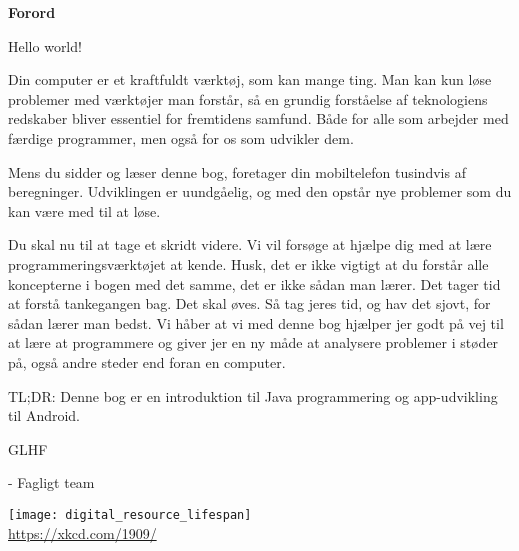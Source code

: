 \cleardoublepage
\begin{titlepage}
	\centering
	\vspace{3cm}
	{\Huge\sffamily\bfseries Forord \par} \vspace{0.5cm}
	
	Hello world!
	
	Din computer er et kraftfuldt værktøj, som kan mange ting. Man kan kun løse problemer med værktøjer man forstår, så en grundig forståelse af teknologiens redskaber bliver essentiel for fremtidens samfund. Både for alle som arbejder med færdige programmer, men også for os som udvikler dem. 
	
	Mens du sidder og læser denne bog, foretager din mobiltelefon tusindvis af beregninger. Udviklingen er uundgåelig, og med den opstår nye problemer som du kan være med til at løse. 
	
	Du skal nu til at tage et skridt videre. Vi vil forsøge at hjælpe dig med at lære programmeringsværktøjet at kende.
	Husk, det er ikke vigtigt at du forstår alle koncepterne i bogen med det samme, det er ikke sådan man lærer.
	Det tager tid at forstå tankegangen bag. Det skal øves.
	Så tag jeres tid, og hav det sjovt, for sådan lærer man bedst.
	Vi håber at vi med denne bog hjælper jer godt på vej til at lære at programmere og giver jer en ny måde at analysere problemer i støder på, også andre steder end foran en computer.
	
	TL;DR: Denne bog er en introduktion til Java programmering og app-udvikling til Android. 
	
	GLHF
	
	- Fagligt team
	
	
	{\texttt{[image: digital\_resource\_lifespan]}\\
		\tiny \url{https://xkcd.com/1909/} \par} \vspace{0.5cm}	
\end{titlepage}
